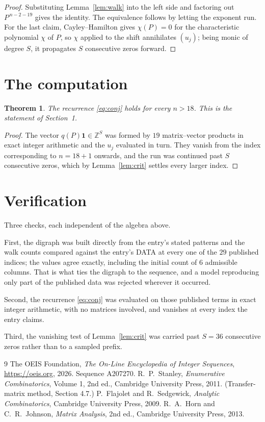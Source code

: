 \documentclass[11pt,a4paper]{article}
\theoremstyle{plain}
\newtheorem{theorem}{Theorem}
\theoremstyle{definition}
\begin{document}
\begin{proof}
Substituting Lemma~\ref{lem:walk} into the left side and factoring out
$P^{\,n-2-19}$ gives the identity. The equivalence follows by letting the exponent
run. For the last claim, Cayley--Hamilton gives $\chi(P)=0$ for the characteristic
polynomial $\chi$ of $P$, so $\chi$ applied to the shift annihilates $(u_j)$; being monic of
degree $S$, it propagates $S$ consecutive zeros forward.
\end{proof}

\section{The computation}

\begin{theorem}
The recurrence \eqref{eq:conj} holds for every $n>18$. This is the statement of
Section~1.
\end{theorem}

\begin{proof}
The vector $q(P)\mathbf{1}\in\mathbb{Z}^{S}$ was formed by $19$ matrix--vector
products in exact integer arithmetic and the $u_j$ evaluated in turn. They vanish from the
index corresponding to $n=18+1$ onwards, and the run was continued past $S$ consecutive
zeros, which by Lemma~\ref{lem:crit} settles every larger index.
\end{proof}

\section{Verification}

Three checks, each independent of the algebra above.

First, the digraph was built directly from the entry's stated patterns and the walk counts
compared against the entry's DATA at every one of the $29$ published indices; the
values agree exactly, including the initial count of $6$ admissible columns. That is
what ties the digraph to the sequence, and a model reproducing only part of the published
data was rejected wherever it occurred.

Second, the recurrence \eqref{eq:conj} was evaluated on those published terms in exact
integer arithmetic, with no matrices involved, and vanishes at every index the entry claims.

Third, the vanishing test of Lemma~\ref{lem:crit} was carried past $S=36$ consecutive
zeros rather than to a sampled prefix.

\begin{thebibliography}{9}
 The OEIS Foundation, \emph{The On-Line Encyclopedia of Integer
Sequences}, \url{https://oeis.org}, 2026. Sequence A207270.
 R.~P.~Stanley, \emph{Enumerative Combinatorics}, Volume 1, 2nd ed.,
Cambridge University Press, 2011. (Transfer-matrix method, Section 4.7.)
 P.~Flajolet and R.~Sedgewick, \emph{Analytic Combinatorics}, Cambridge
University Press, 2009.
 R.~A.~Horn and C.~R.~Johnson, \emph{Matrix Analysis}, 2nd ed., Cambridge
University Press, 2013.
\end{thebibliography}
\end{document}
